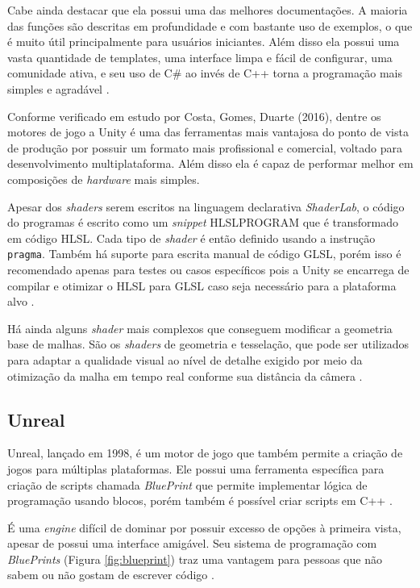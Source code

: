 Cabe ainda destacar que ela possui uma das melhores documentações. A maioria das funções são descritas em profundidade e com bastante uso de exemplos, o que é muito útil principalmente para usuários iniciantes. Além disso ela possui uma vasta quantidade de templates, uma interface limpa e fácil de configurar, uma comunidade ativa, e seu uso de C\# ao invés de C++ torna a programação mais simples e agradável \cite{compStudyGE}.

Conforme verificado em estudo por Costa, Gomes, Duarte (2016)\nocite{estudoUnity}, dentre os motores de jogo a Unity é uma das ferramentas mais vantajosa do ponto de vista de produção por possuir um formato mais profissional e comercial, voltado para desenvolvimento multiplataforma. Além disso ela é capaz de performar melhor em composições de \textit{hardware} mais simples.

Apesar dos \textit{shaders} serem escritos na linguagem declarativa \textit{ShaderLab}, o código do programas é escrito como um \textit{snippet} HLSLPROGRAM que é transformado em código HLSL. Cada tipo de \textit{shader} é então definido usando a instrução \texttt{pragma}. Também há suporte para escrita manual de código GLSL, porém isso é recomendado apenas para testes ou casos específicos pois a Unity se encarrega de compilar e otimizar o HLSL para GLSL caso seja necessário para a plataforma alvo \cite{hasu2018modern}. 

Há ainda alguns \textit{shader} mais complexos que conseguem modificar a geometria base de malhas. São os \textit{shaders} de geometria e tesselação, que pode ser utilizados para adaptar a qualidade visual ao nível de detalhe exigido por meio da otimização da malha em tempo real conforme sua distância da câmera \cite{aino2020}.

\subsection{Unreal}
\label{sec:unreal}

Unreal, lançado em 1998, é um motor de jogo que também permite a criação de jogos para múltiplas plataformas. Ele possui uma ferramenta específica para criação de scripts chamada \textit{BluePrint} que permite implementar lógica de programação usando blocos, porém também é possível criar scripts em C++ \cite{compStudyGE}.

É uma \textit{engine} difícil de dominar por possuir excesso de opções à primeira vista, apesar de possui uma interface amigável. Seu sistema de programação com \textit{BluePrints} (Figura \ref{fig:blueprint}) traz uma vantagem para pessoas que não sabem ou não gostam de escrever código \cite{compStudyGE}.

